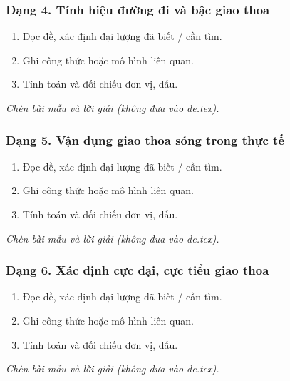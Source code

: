 \subsubsection{Dạng 4. Tính hiệu đường đi và bậc giao thoa}
\begin{phuongphap}
\begin{enumerate}
\item Đọc đề, xác định đại lượng đã biết / cần tìm.
\item Ghi công thức hoặc mô hình liên quan.
\item Tính toán và đối chiếu đơn vị, dấu.
\end{enumerate}
\end{phuongphap}
\begin{vidumau}
\textit{Chèn bài mẫu và lời giải (không đưa vào de.tex).}
\end{vidumau}

\subsubsection{Dạng 5. Vận dụng giao thoa sóng trong thực tế}
\begin{phuongphap}
\begin{enumerate}
\item Đọc đề, xác định đại lượng đã biết / cần tìm.
\item Ghi công thức hoặc mô hình liên quan.
\item Tính toán và đối chiếu đơn vị, dấu.
\end{enumerate}
\end{phuongphap}
\begin{vidumau}
\textit{Chèn bài mẫu và lời giải (không đưa vào de.tex).}
\end{vidumau}

\subsubsection{Dạng 6. Xác định cực đại, cực tiểu giao thoa}
\begin{phuongphap}
\begin{enumerate}
\item Đọc đề, xác định đại lượng đã biết / cần tìm.
\item Ghi công thức hoặc mô hình liên quan.
\item Tính toán và đối chiếu đơn vị, dấu.
\end{enumerate}
\end{phuongphap}
\begin{vidumau}
\textit{Chèn bài mẫu và lời giải (không đưa vào de.tex).}
\end{vidumau}


